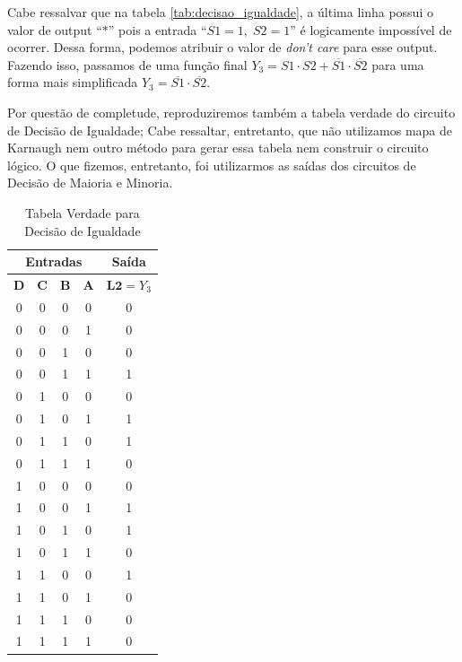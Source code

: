 \documentclass[12pt]{article}
\begin{document}
Cabe ressalvar que na tabela \ref{tab:decisao_igualdade}, a última linha possui
o valor de output ``\(*\)'' pois a entrada ``\(S1 = 1, \; S2 = 1\)'' é
logicamente impossível de ocorrer. Dessa forma, podemos atribuir o valor de
\emph{don't care} para esse output. Fazendo isso, passamos de uma função final
\(Y_{3} = S1 \cdot S2 + \overline{S1} \cdot \overline{S2}\) para uma forma mais
simplificada \(Y_{3} = \overline{S1} \cdot \overline{S2} \).

Por questão de completude, reproduziremos também a tabela verdade do circuito de
Decisão de Igualdade; Cabe ressaltar, entretanto, que não utilizamos mapa de
Karnaugh nem outro método para gerar essa tabela nem construir o circuito
lógico. O que fizemos, entretanto, foi utilizarmos as saídas dos circuitos de
Decisão de Maioria e Minoria.

\begin{table}[H]
    \centering
    \caption{Tabela Verdade para Decisão de Igualdade}
    \begin{tabular}{|c|c|c|c|c|}\hline
    \multicolumn{4}{|c|}{Entradas} & \multicolumn{1}{|c|}{Saída} \\\hline
    \textbf{D} & \textbf{C} & \textbf{B} & \textbf{A} & $\textbf{L2}=Y_{3}$ \\\hline
    0 & 0 & 0 & 0 & 0 \\\hline
    0 & 0 & 0 & 1 & 0 \\\hline
    0 & 0 & 1 & 0 & 0 \\\hline
    0 & 0 & 1 & 1 & 1 \\\hline
    0 & 1 & 0 & 0 & 0 \\\hline
    0 & 1 & 0 & 1 & 1 \\\hline
    0 & 1 & 1 & 0 & 1 \\\hline
    0 & 1 & 1 & 1 & 0 \\\hline
    1 & 0 & 0 & 0 & 0 \\\hline
    1 & 0 & 0 & 1 & 1 \\\hline
    1 & 0 & 1 & 0 & 1 \\\hline
    1 & 0 & 1 & 1 & 0 \\\hline
    1 & 1 & 0 & 0 & 1 \\\hline
    1 & 1 & 0 & 1 & 0 \\\hline
    1 & 1 & 1 & 0 & 0 \\\hline
    1 & 1 & 1 & 1 & 0 \\\hline
    \end{tabular}\label{tab:tabela_verdade_decisao_igualdade}
\end{table}
\end{document}
